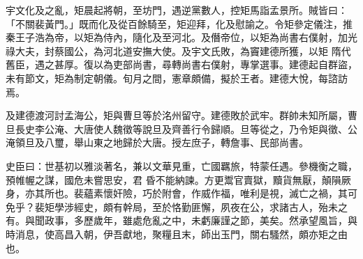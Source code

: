 \begin{pinyinscope}
 宇文化及之亂，矩晨起將朝，至坊門，遇逆黨數人，控矩馬詣孟景所。賊皆曰：「不關裴黃門。」既而化及從百餘騎至，矩迎拜，化及慰諭之。令矩參定儀注，推秦王子浩為帝，以矩為侍內，隨化及至河北。及僭帝位，以矩為尚書右僕射，加光祿大夫，封蔡國公，為河北道安撫大使。及宇文氏敗，為竇建德所獲，以矩
 隋代舊臣，遇之甚厚。復以為吏部尚書，尋轉尚書右僕射，專掌選事。建德起自群盜，未有節文，矩為制定朝儀。旬月之間，憲章頗備，擬於王者。建德大悅，每諮訪焉。



 及建德渡河討孟海公，矩與曹旦等於洺州留守。建德敗於武牢。群帥未知所屬，曹旦長史李公淹、大唐使人魏徵等說旦及齊善行令歸順。旦等從之，乃令矩與徵、公淹領旦及八璽，舉山東之地歸於大唐。授左庶子，轉詹事、民部尚書。



 史臣曰：世基初以雅淡著名，兼以文華見重，亡國羈旅，特蒙任遇。參機衡之職，預帷幄之謀，國危未嘗思安，君
 昏不能納諫。方更鬻官賣獄，黷貨無厭，顛隕厥身，亦其所也。裴蘊素懷奸險，巧於附會，作威作福，唯利是視，滅亡之禍，其可免乎？裴矩學涉經史，頗有幹局，至於恪勤匪懈，夙夜在公，求諸古人，殆未之有。與聞政事，多歷歲年，雖處危亂之中，未虧廉謹之節，美矣。然承望風旨，與時消息，使高昌入朝，伊吾獻地，聚糧且末，師出玉門，關右騷然，頗亦矩之由也。



\end{pinyinscope}
